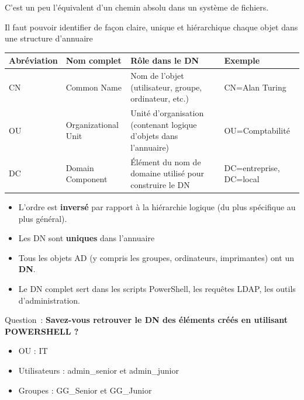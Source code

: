 \noindent C’est un peu l’équivalent d’un chemin absolu dans un système de fichiers.

\noindent Il faut pouvoir identifier de façon claire, unique et hiérarchique chaque objet dans une structure d'annuaire

\vspace{0.5cm}

\begin{center}
{\small
\begin{tabular}{|l|l|p{4cm}|l|}
\hline
Abréviation & Nom complet & Rôle dans le DN & Exemple \\ \hline
CN & Common Name & Nom de l’objet (utilisateur, groupe, ordinateur, etc.) & CN=Alan Turing \\ \hline
OU & Organizational Unit & Unité d’organisation (contenant logique d'objets dans l'annuaire) & OU=Comptabilité \\ \hline
DC & Domain Component & Élément du nom de domaine utilisé pour construire le DN & DC=entreprise, DC=local \\ \hline
\end{tabular}
}
\end{center}

\vspace{0.5cm}

\begin{itemize}
  \item L’ordre est \textbf{inversé} par rapport à la hiérarchie logique (du plus spécifique au plus général).
  \item Les DN sont \textbf{uniques} dans l’annuaire
  \item Tous les objets AD (y compris les groupes, ordinateurs, imprimantes) ont un \textbf{DN}.
  \item Le DN complet sert dans les scripts PowerShell, les requêtes LDAP, les outils d’administration.
\end{itemize}

\newpage

\noindent Question~: \textbf{Savez-vous retrouver le DN des éléments créés en utilisant POWERSHELL ?}

\begin{itemize}
  \item OU : IT
  \item Utilisateurs : admin\_senior et admin\_junior
  \item Groupes : GG\_Senior et GG\_Junior
\end{itemize}

\vspace{0.5cm}

